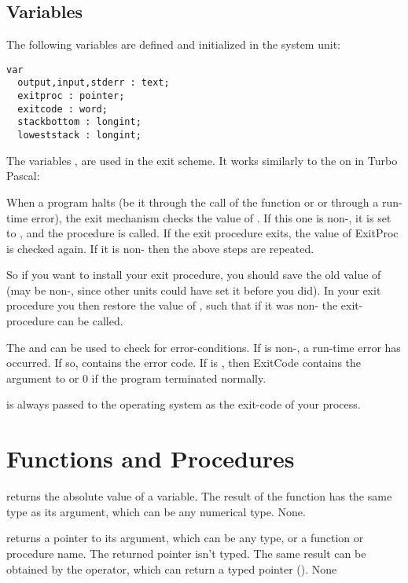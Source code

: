 \documentclass{report}
\begin{document}
\subsection{Variables}
The following variables are defined and initialized in the system unit:
\begin{verbatim}
var
  output,input,stderr : text;
  exitproc : pointer;
  exitcode : word;
  stackbottom : longint;
  loweststack : longint;
\end{verbatim}
The variables ,  are used in the \fpc exit
scheme. It works similarly to the on in Turbo Pascal:

When a program halts (be it through the call of the  function or
 or through a run-time error), the exit mechanism checks the value
of . If this one is non-, it is set to , and
the procedure is called. If the exit procedure exits, the value of ExitProc
is checked again. If it is non- then the above steps are repeated.

So if you want to install your exit procedure, you should save the old value
of  (may be non-, since other units could have set it before 
you did). In your exit procedure you then restore the value of
, such that if it was non- the exit-procedure can be
called.

The  and  can be used to check for
error-conditions. If  is non-, a run-time error has
occurred. If so,  contains the error code. If  is
, then {ExitCode} contains the argument to  or 0 if the
program terminated normally.

 is always passed to the operating system as the exit-code of
your process.

\section{Functions and Procedures}
{ returns the absolute value of a variable. The result of the
function has the same type as its argument, which can be any numerical
type.}
{None.}
{}



{ returns a pointer to its argument, which can be any type, or a
function or procedure name. The returned pointer isn't typed.
The same result can be obtained by the  operator, which can return a
typed pointer (\progref). }
{None}
{}
\end{document}
